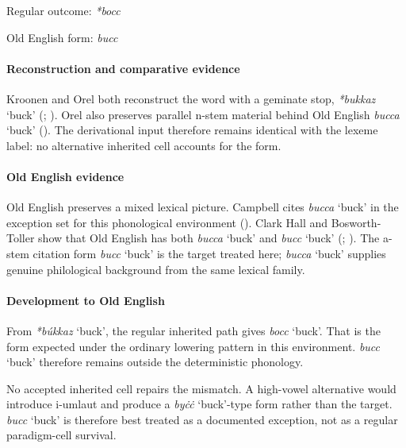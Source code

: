 \documentclass[
  british,
  a4paper,
]{article}
\providecommand{\Recon}[1]{\emph{*#1}}
\begin{document}
Regular outcome: \Recon{bocc}

Old English form: \emph{bucc}

\paragraph{Reconstruction and comparative
evidence}\label{reconstruction-and-comparative-evidence-153}

Kroonen and Orel both reconstruct the word with a geminate stop,
\Recon{bukkaz} `buck' (;
). Orel also preserves parallel
n-stem material behind Old English {\emph{bucca}} `buck'
(). The derivational input
therefore remains identical with the lexeme label: no alternative
inherited cell accounts for the form.

\paragraph{Old English evidence}\label{old-english-evidence-155}

Old English preserves a mixed lexical picture. Campbell cites
{\emph{bucca}} `buck' in the exception set for this phonological
environment ().
Clark Hall and Bosworth-Toller show that Old English has both
{\emph{bucca}} `buck' and {\emph{bucc}} `buck'
(;
). The
a-stem citation form {\emph{bucc}} `buck' is the target treated here;
{\emph{bucca}} `buck' supplies genuine philological background from the
same lexical family.

\paragraph{Development to Old
English}\label{development-to-old-english-154}

From \Recon{búkkaz} `buck', the regular inherited path gives
{\emph{bocc}} `buck'. That is the form expected under the ordinary
lowering pattern in this environment. {\emph{bucc}} `buck' therefore
remains outside the deterministic phonology.

No accepted inherited cell repairs the mismatch. A high-vowel
alternative would introduce i-umlaut and produce a {\emph{byċċ}}
`buck'-type form rather than the target. {\emph{bucc}} `buck' is
therefore best treated as a documented exception, not as a regular
paradigm-cell survival.
\end{document}
